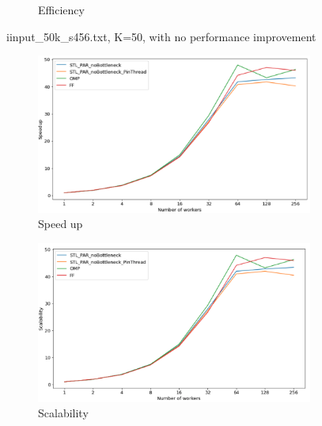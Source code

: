 \documentclass[12pt,a4paper]{report}
\begin{document}
\begin{figure}
\begin{subfigure}[b]{0.45\textwidth}
         \caption{Efficiency}
         \label{fig:improved performance}
     \end{subfigure}
        \caption{i{input\_50k\_s456.txt, K=50, with no performance improvement}}
        \label{fig:three graphs}
\end{figure}

\begin{figure}
     \centering
     \begin{subfigure}[b]{0.45\textwidth}
         \centering
         \includegraphics[width=\textwidth]{images/optimized-20k/speedup.png}
         \caption{Speed up}
         \label{fig:y equals x}
     \end{subfigure}
     \hfill
     \begin{subfigure}[b]{0.45\textwidth}
         \centering
         \includegraphics[width=\textwidth]{images/optimized-20k/scalability.png}
         \caption{Scalability}
         \label{fig:three sin x}
     \end{subfigure}
     \hfill
     \begin{subfigure}[b]{0.45\textwidth}

\end{subfigure}
\end{figure}
\end{document}
